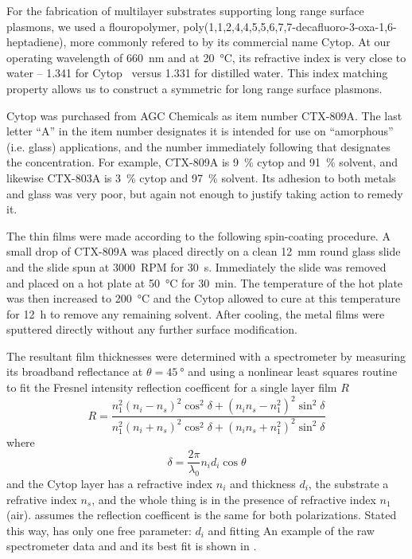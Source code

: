 For the fabrication of multilayer substrates supporting long range surface
plasmons, we used a flouropolymer,
poly(1,1,2,4,4,5,5,6,7,7-decafluoro-3-oxa-1,6-heptadiene), more commonly
refered to by 
its commercial name Cytop.  At our operating wavelength of \SI{660}{\nano\meter} and at
\SI{20}{\celsius}, its refractive index is very close to water --
1.341 for Cytop~\cite{mikevs2005synthesis} versus 1.331 for distilled
water.  This index matching property allows us to construct a symmetric for
long range surface plasmons.

Cytop was purchased from AGC Chemicals as item number CTX-809A.  The last
letter ``A'' in the item number designates it is intended for use on
``amorphous'' (i.e. glass) applications, and the number immediately
following that designates the concentration.  For example, CTX-809A is
\SI{9}{\percent} cytop and \SI{91}{\percent} solvent, and likewise CTX-803A
is \SI{3}{\percent} cytop and \SI{97}{\percent} solvent.  Its adhesion to
both metals and glass was very poor, but again not enough to justify taking
action to remedy it.

The thin films were made according to the following spin-coating procedure.
A small drop of CTX-809A was placed directly on a clean
\SI{12}{\milli\meter} round glass slide and the slide spun at
\SI{3000}{RPM} for \SI{30}{\second}.  Immediately the slide was removed and
placed on a hot plate at \SI{50}{\celsius} for \SI{30}{\minute}.  The
temperature of the hot plate was then increased to \SI{200}{\celsius} and
the Cytop allowed to cure at this temperature for \SI{12}{\hour} to remove
any remaining solvent.  After cooling, the metal films were sputtered
directly without any further surface modification.

The resultant film thicknesses were determined with a spectrometer by
measuring its broadband reflectance at $\theta=\SI{45}{\degree}$ and using
a nonlinear least squares routine~\cite{more1977LevAlgImpThe_2} to 
fit the Fresnel intensity reflection coefficent for a single layer
film $R$~\cite{steck2006classical} 
\begin{equation}
 R = \frac{n_1^2(n_i-n_s)^2 \cos^2\delta + (n_i n_s - n_1^2)^2\sin^2\delta}
          {n_1^2(n_i+n_s)^2 \cos^2\delta + (n_i n_s + n_1^2)^2\sin^2\delta}
          \label{eqn:fitfresnel}
\end{equation}
where
\begin{equation}
 \delta = \frac{2\pi}{\lambda_0} n_i d_i \cos \theta
\end{equation}
and the Cytop layer has a refractive index $n_i$ and thickness $d_i$, the
substrate a refrative index $n_s$, and the whole thing is in the presence
of refractive index $n_1$ (air).   assumes the
reflection coefficent is the same for both polarizations.  Stated this way,
 has only one free parameter: $d_i$ and fitting
An example of the raw spectrometer data and and its best fit is shown in
.


